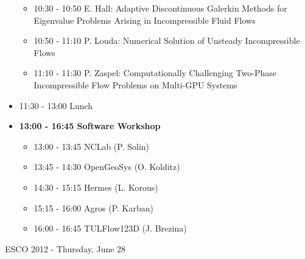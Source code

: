 \documentclass[10pt, A4]{article}%
\begin{document}
\begin{itemize}
\begin{itemize}
    \item 10:30 - 10:50 E. Hall: Adaptive Discontinuous Galerkin Methods for Eigenvalue Problems Arising in Incompressible Fluid Flows
    \item 10:50 - 11:10 P. Louda: Numerical Solution of Unsteady Incompressible Flows
    \item 11:10 - 11:30 P. Zaspel: Computationally Challenging Two-Phase Incompressible Flow Problems on Multi-GPU Systems
  \end{itemize}
  \item 11:30 - 13:00 Lunch
  \item {\bf 13:00 - 16:45 Software Workshop}
  \begin{itemize}
    \item 13:00 - 13:45 NCLab (P. Solin)
    \item 13:45 - 14:30 OpenGeoSys (O. Kolditz)
    \item 14:30 - 15:15 Hermes (L. Korous)
    \item 15:15 - 16:00 Agros (P. Karban)
    \item 16:00 - 16:45 TULFlow123D (J. Brezina)
  \end{itemize}
\end{itemize}

\newpage

\centerline{\huge ESCO 2012 - Thursday, June 28}
\vspace{4mm}
\end{document}
